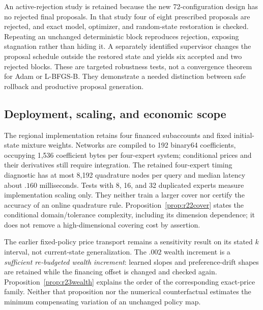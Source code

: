 An active-rejection study is retained because the new 72-configuration design has no rejected final proposals. In that study four of eight prescribed proposals are rejected, and exact model, optimizer, and random-state restoration is checked. Repeating an unchanged deterministic block reproduces rejection, exposing stagnation rather than hiding it. A separately identified supervisor changes the proposal schedule outside the restored state and yields six accepted and two rejected blocks. These are targeted robustness tests, not a convergence theorem for Adam or L-BFGS-B. They demonstrate a needed distinction between safe rollback and productive proposal generation.

\subsection{Deployment, scaling, and economic scope}
The regional implementation retains four financed subaccounts and fixed initial-state mixture weights. Networks are compiled to 192 binary64 coefficients, occupying 1,536 coefficient bytes per four-expert system; conditional prices and their derivatives still require integration. The retained four-expert timing diagnostic has at most 8,192 quadrature nodes per query and median latency about $.160$ milliseconds. Tests with 8, 16, and 32 duplicated experts measure implementation scaling only. They neither train a larger cover nor certify the accuracy of an online quadrature rule. Proposition~\ref{prop:r22cover} states the conditional domain/tolerance complexity, including its dimension dependence; it does not remove a high-dimensional covering cost by assertion.

The earlier fixed-policy price transport remains a sensitivity result on its stated $k$ interval, not current-state generalization. The $.002$ wealth increment is a \emph{sufficient re-budgeted wealth increment}: learned slopes and preference-drift shapes are retained while the financing offset is changed and checked again. Proposition~\ref{prop:r23wealth} explains the order of the corresponding exact-price family. Neither that proposition nor the numerical counterfactual estimates the minimum compensating variation of an unchanged policy map.
